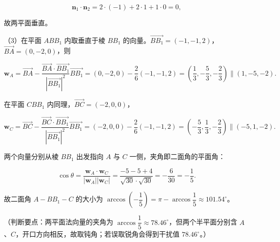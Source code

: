 \begin{answer}
\nopagebreak[4]
\[\boldsymbol n_1\cdot\boldsymbol n_2=2\cdot(-1)+2\cdot1+1\cdot0=0,\]

故两平面垂直。

（3）在平面 $ABB_1$ 内取垂直于棱 $BB_1$ 的向量。$\overrightarrow{BB_1}=(-1,-1,2)$，$\overrightarrow{BA}=(0,-2,0)$，则

\nopagebreak[4]
\[\boldsymbol w_A=\overrightarrow{BA}-\frac{\overrightarrow{BA}\cdot\overrightarrow{BB_1}}{|\overrightarrow{BB_1}|^2}\overrightarrow{BB_1}=(0,-2,0)-\frac{2}{6}(-1,-1,2)=\left(\frac13,-\frac53,-\frac23\right)\parallel(1,-5,-2).\]

在平面 $CBB_1$ 内同理，$\overrightarrow{BC}=(-2,0,0)$，

\nopagebreak[4]
\[\boldsymbol w_C=\overrightarrow{BC}-\frac{\overrightarrow{BC}\cdot\overrightarrow{BB_1}}{|\overrightarrow{BB_1}|^2}\overrightarrow{BB_1}=(-2,0,0)-\frac{2}{6}(-1,-1,2)=\left(-\frac53,\frac13,-\frac23\right)\parallel(-5,1,-2).\]

两个向量分别从棱 $BB_1$ 出发指向 $A$ 与 $C$ 一侧，夹角即二面角的平面角：

\nopagebreak[4]
\[\cos\theta=\frac{\boldsymbol w_A\cdot\boldsymbol w_C}{|\boldsymbol w_A||\boldsymbol w_C|}=\frac{-5-5+4}{\sqrt{30}\cdot\sqrt{30}}=-\frac{6}{30}=-\frac15.\]

故二面角 $A-BB_1-C$ 的大小为 $\arccos\left(-\dfrac15\right)=\pi-\arccos\dfrac15\approx101.54^\circ$。

（判断要点：两平面法向量的夹角为 $\arccos\dfrac15\approx78.46^\circ$，但两个半平面分别含 $A$、$C$，开口方向相反，故取钝角；若误取锐角会得到干扰值 $78.46^\circ$。）


\end{answer}
